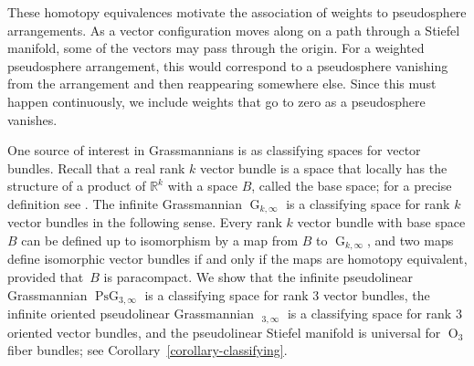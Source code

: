 \documentclass[JEP,XML,SOM,Unicode,NoFloatCountersInSection,published]{cedram}
\theoremstyle{remark}
\let\mb\mathbb
\DeclareMathOperator{\pg}{PsG}
\DeclareMathOperator{\pog}{Ps\widetilde G}
\DeclareMathOperator{\g}{G}
\DeclareMathOperator{\orth}{O}
\begin{document}
These homotopy equivalences motivate the association of weights to pseudosphere arrangements.
As a vector configuration moves along on a path through a Stiefel manifold, some of the vectors may pass through the origin. For a weighted pseudosphere arrangement, this would correspond to a pseudosphere vanishing from the arrangement and then reappearing somewhere else. Since this must happen continuously, we include weights that go to zero as a pseudosphere vanishes.

One source of interest in Grassmannians is as classifying spaces for vector bundles.
Recall that a real rank $k$ vector bundle is a space that locally has the structure of a product of $\mb{R}^k$ with a space $B$, called the base space; for a precise definition see \cite[p.\,24]{husemoller1994fibre}.
The infinite Grassmannian $\g_{k,\infty}$ is a classifying space for rank $k$ vector bundles in the following sense.
Every rank $k$ vector bundle with base space $B$ can be defined up to isomorphism by a map from $B$ to $\g_{k,\infty}$, and two maps define isomorphic vector bundles if and only if the maps are homotopy equivalent, provided that~$B$ is paracompact.
We show that the infinite pseudolinear Grassmannian $\pg_{3,\infty}$ is a classifying space for rank $3$ vector bundles, the infinite oriented pseudolinear Grassmannian $\pog_{3,\infty}$ is a classifying space for rank $3$ oriented vector bundles, and the pseudolinear Stiefel manifold is universal for $\orth_3$ fiber bundles; see Corollary~\ref{corollary-classifying}.
\end{document}
